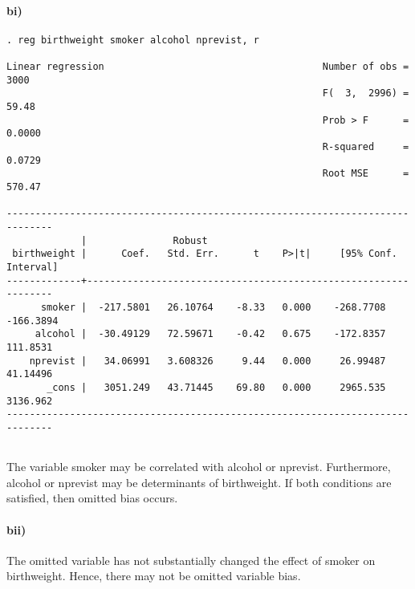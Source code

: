 \documentclass[letterpaper,12pt,titlepage,oneside,final]{book}
\begin{document}
\paragraph{bi)}
\begin{verbatim}
. reg birthweight smoker alcohol nprevist, r

Linear regression                                      Number of obs =    3000
                                                       F(  3,  2996) =   59.48
                                                       Prob > F      =  0.0000
                                                       R-squared     =  0.0729
                                                       Root MSE      =  570.47

------------------------------------------------------------------------------
             |               Robust
 birthweight |      Coef.   Std. Err.      t    P>|t|     [95% Conf. Interval]
-------------+----------------------------------------------------------------
      smoker |  -217.5801   26.10764    -8.33   0.000    -268.7708   -166.3894
     alcohol |  -30.49129   72.59671    -0.42   0.675    -172.8357    111.8531
    nprevist |   34.06991   3.608326     9.44   0.000     26.99487    41.14496
       _cons |   3051.249   43.71445    69.80   0.000     2965.535    3136.962
------------------------------------------------------------------------------


\end{verbatim}

The variable smoker may be correlated with alcohol or nprevist. Furthermore, alcohol or nprevist may be determinants of birthweight. If both conditions are satisfied, then omitted bias occurs.

\paragraph{bii)}
The omitted variable has not substantially changed the effect of smoker on birthweight. Hence, there may not be omitted variable bias.
\end{document}
